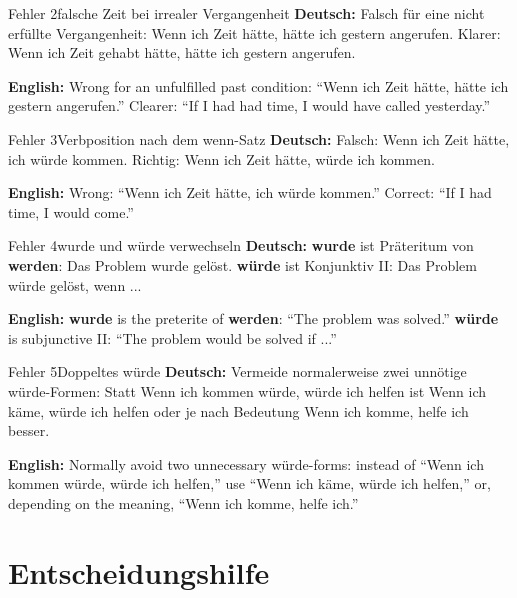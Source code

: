 \documentclass[a4paper,11pt]{article}
\newcommand{\GermanText}[1]{\textbf{Deutsch: }#1\par}
\newcommand{\EnglishText}[1]{{\small\color{SoftGray}\textbf{English: }#1\par}}
\begin{document}
        \begin{grammarentry}{Fehler 2}{falsche Zeit bei irrealer Vergangenheit}
            \GermanText{Falsch für eine nicht erfüllte Vergangenheit: \glqq Wenn ich Zeit hätte, hätte ich gestern angerufen.\grqq{} Klarer: \glqq Wenn ich Zeit gehabt hätte, hätte ich gestern angerufen.\grqq}
            \EnglishText{Wrong for an unfulfilled past condition: ``Wenn ich Zeit hätte, hätte ich gestern angerufen.'' Clearer: ``If I had had time, I would have called yesterday.''}
        \end{grammarentry}

        \begin{grammarentry}{Fehler 3}{Verbposition nach dem wenn-Satz}
            \GermanText{Falsch: \glqq Wenn ich Zeit hätte, ich würde kommen.\grqq{} Richtig: \glqq Wenn ich Zeit hätte, würde ich kommen.\grqq}
            \EnglishText{Wrong: ``Wenn ich Zeit hätte, ich würde kommen.'' Correct: ``If I had time, I would come.''}
        \end{grammarentry}

        \begin{grammarentry}{Fehler 4}{wurde und würde verwechseln}
            \GermanText{\textbf{wurde} ist Präteritum von \textbf{werden}: \glqq Das Problem wurde gelöst.\grqq{} \textbf{würde} ist Konjunktiv II: \glqq Das Problem würde gelöst, wenn ...\grqq}
            \EnglishText{\textbf{wurde} is the preterite of \textbf{werden}: ``The problem was solved.'' \textbf{würde} is subjunctive II: ``The problem would be solved if ...''}
        \end{grammarentry}

        \begin{grammarentry}{Fehler 5}{Doppeltes würde}
            \GermanText{Vermeide normalerweise zwei unnötige würde-Formen: Statt \glqq Wenn ich kommen würde, würde ich helfen\grqq{} ist \glqq Wenn ich käme, würde ich helfen\grqq{} oder je nach Bedeutung \glqq Wenn ich komme, helfe ich\grqq{} besser.}
            \EnglishText{Normally avoid two unnecessary würde-forms: instead of ``Wenn ich kommen würde, würde ich helfen,'' use ``Wenn ich käme, würde ich helfen,'' or, depending on the meaning, ``Wenn ich komme, helfe ich.''}
        \end{grammarentry}

    \section{Entscheidungshilfe}
\end{document}
